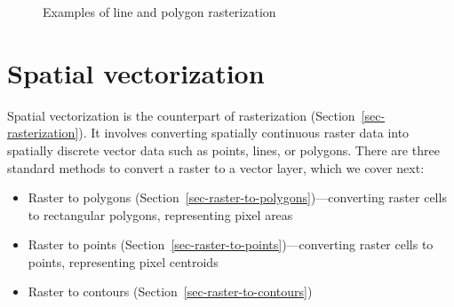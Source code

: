 \documentclass[
  letterpaper,
]{krantz}
\providecommand{\tightlist}{%
  \setlength{\itemsep}{0pt}\setlength{\parskip}{0pt}}\usepackage{longtable,booktabs,array}
\begin{document}
\begin{figure}

\begin{minipage}{0.50\linewidth}



\end{minipage}%
%
\begin{minipage}{0.50\linewidth}



\end{minipage}%

\caption{\label{fig-rasterize-lines-polygons}Examples of line and
polygon rasterization}

\end{figure}%

\section{Spatial vectorization}\label{sec-spatial-vectorization}

Spatial vectorization is the counterpart of rasterization
(Section~\ref{sec-rasterization}). It involves converting spatially
continuous raster data into spatially discrete vector data such as
points, lines, or polygons. There are three standard methods to convert
a raster to a vector layer, which we cover next:

\begin{itemize}
\tightlist
\item
  Raster to polygons (Section~\ref{sec-raster-to-polygons})---converting
  raster cells to rectangular polygons, representing pixel areas
\item
  Raster to points (Section~\ref{sec-raster-to-points})---converting
  raster cells to points, representing pixel centroids
\item
  Raster to contours (Section~\ref{sec-raster-to-contours})
\end{itemize}
\end{document}
